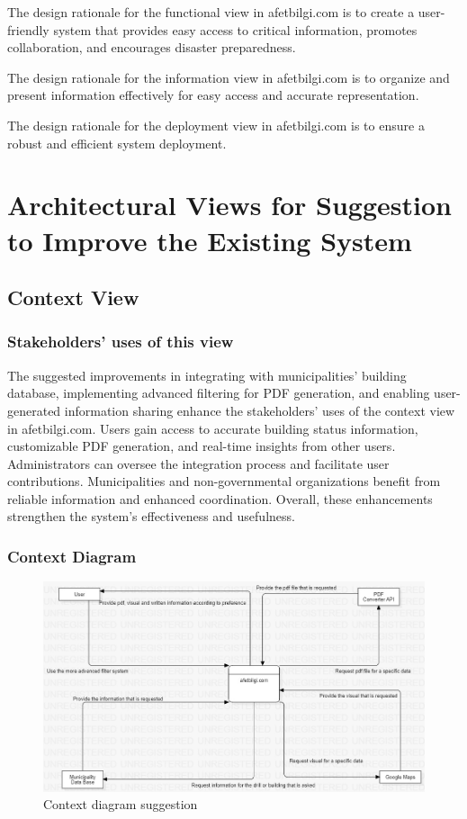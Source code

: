 \documentclass[12pt]{report}
\begin{document}
The design rationale for the functional view in afetbilgi.com is to create a user-friendly system that provides easy access to critical information, promotes collaboration, and encourages disaster preparedness.
\newline

The design rationale for the information view in afetbilgi.com is to organize and present information effectively for easy access and accurate representation.
\newline

The design rationale for the deployment view in afetbilgi.com is to ensure a robust and efficient system deployment.

\chapter{Architectural Views for Suggestion to Improve the Existing System}

\section{Context View}

\subsection{Stakeholders' uses of this view}
The suggested improvements in integrating with municipalities' building database, implementing advanced filtering for PDF generation, 
and enabling user-generated information sharing enhance the stakeholders' uses of the context view in afetbilgi.com. Users gain access to accurate 
building status information, customizable PDF generation, and real-time insights from other users. Administrators can oversee the integration process 
and facilitate user contributions. Municipalities and non-governmental organizations benefit from reliable information and enhanced coordination. Overall, 
these enhancements strengthen the system's effectiveness and usefulness.

\subsection{Context Diagram}

\begin{figure}[H]
    \includegraphics[scale=0.5]{context2}
    \centering
    \caption{Context diagram suggestion}
\end{figure}
\end{document}
